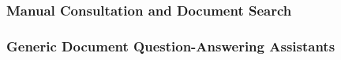 \subsubsection{Manual Consultation and Document Search}


\subsubsection{Generic Document Question-Answering Assistants}



